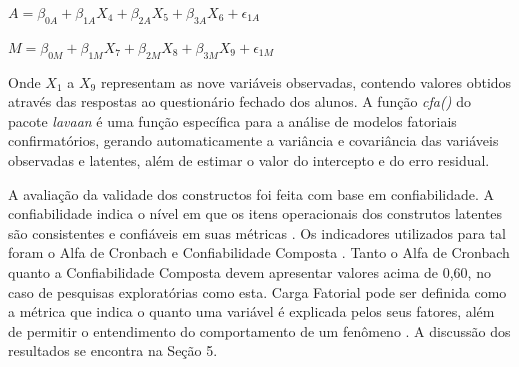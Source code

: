 $A = \beta_{0A} + \beta_{1A}X_{4} + \beta_{2A}X_{5} + \beta_{3A}X_{6} + \epsilon_{1A}$

$M = \beta_{0M} + \beta_{1M}X_{7} + \beta_{2M}X_{8} + \beta_{3M}X_{9} + \epsilon_{1M}$

Onde $X_{1}$ a $X_{9}$ representam as nove variáveis observadas, contendo valores obtidos através das respostas ao questionário fechado dos alunos. A função \textit{cfa()} do pacote \textit{lavaan} é uma função específica para a análise de modelos fatoriais confirmatórios, gerando automaticamente a variância e covariância das variáveis observadas e latentes, além de estimar o valor do intercepto e do erro residual.

A avaliação da validade dos constructos foi feita com base em confiabilidade. A confiabilidade indica o nível em que os itens operacionais dos construtos latentes são consistentes e confiáveis em suas métricas \cite{hair2005fundamentos}. Os indicadores utilizados para tal foram o Alfa de Cronbach e Confiabilidade Composta \cite{chin1998commentary}. Tanto o Alfa de Cronbach quanto a Confiabilidade Composta devem apresentar valores acima de 0,60, no caso de pesquisas exploratórias \cite{hair2005fundamentos} como esta. Carga Fatorial pode ser definida como a métrica que indica o quanto uma variável é explicada pelos seus fatores, além de permitir o entendimento do comportamento de um fenômeno \cite{hair2005fundamentos}. A discussão dos resultados se encontra na Seção 5.